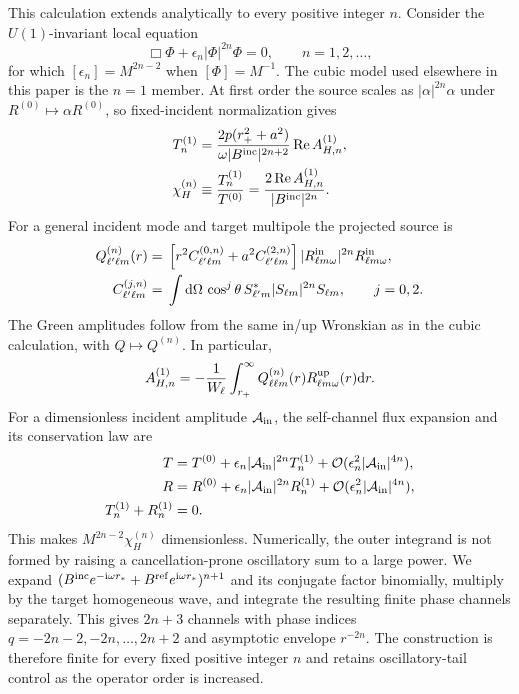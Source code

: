 \documentclass[aps,prd,twocolumn,10pt,nofootinbib,superscriptaddress,floatfix]{revtex4-2}
\newcommand{\dd}{\mathrm{d}}
\newcommand{\ii}{\mathrm{i}}
\newcommand{\calO}{\mathcal{O}}
\begin{document}
This calculation extends analytically to every positive integer $n$.  Consider
the $U(1)$-invariant local equation
\begin{equation}
 \Box\Phi+\epsilon_n|\Phi|^{2n}\Phi=0,
 \qquad n=1,2,\ldots,
 \label{eq:power-nonlinearity}
\end{equation}
for which $[\epsilon_n]=M^{2n-2}$ when $[\Phi]=M^{-1}$.  The cubic model used
elsewhere in this paper is the $n=1$ member.  At first order the source scales
as $|\alpha|^{2n}\alpha$ under
$R^{(0)}\mapsto\alpha R^{(0)}$, so fixed-incident normalization gives
\begin{align}
 T_n^{(1)}&=\frac{2p(r_+^2+a^2)}{\omega|B^{\rm inc}|^{2n+2}}
 \operatorname{Re}A_{H,n}^{(1)},\nonumber\\
 \chi_H^{(n)}&\equiv\frac{T_n^{(1)}}{T^{(0)}}
 =\frac{2\operatorname{Re}A_{H,n}^{(1)}}{|B^{\rm inc}|^{2n}}.
 \label{eq:power-response}
\end{align}
For a general incident mode and target multipole the projected source is
\begin{align}
 Q^{(n)}_{\ell'\ell m}(r)={}&
 \left[r^2C^{(0,n)}_{\ell'\ell m}
 +a^2C^{(2,n)}_{\ell'\ell m}\right]
 |R^{\rm in}_{\ell m\omega}|^{2n}R^{\rm in}_{\ell m\omega},
 \label{eq:power-radial-source}\\
 C^{(j,n)}_{\ell'\ell m}={}&\int\dd\Omega\,\cos^j\theta\,
 S_{\ell'm}^*|S_{\ell m}|^{2n}S_{\ell m},
 \qquad j=0,2 .
 \label{eq:power-angular-general}
\end{align}
The Green amplitudes follow from the same in/up Wronskian as in the cubic
calculation, with $Q\mapsto Q^{(n)}$.  In particular,
\begin{equation}
 A_{H,n}^{(1)}=-\frac{1}{W_\ell}\int_{r_+}^{\infty}
 Q^{(n)}_{\ell\ell m}(r)R^{\rm up}_{\ell m\omega}(r)\dd r .
 \label{eq:power-horizon-green}
\end{equation}
For a dimensionless incident amplitude ${\cal A}_{\rm in}$, the self-channel
flux expansion and its conservation law are
\begin{align}
 T={}&T^{(0)}+\epsilon_n|{\cal A}_{\rm in}|^{2n}T_n^{(1)}
 +\calO(\epsilon_n^2|{\cal A}_{\rm in}|^{4n}),\nonumber\\
 R={}&R^{(0)}+\epsilon_n|{\cal A}_{\rm in}|^{2n}R_n^{(1)}
 +\calO(\epsilon_n^2|{\cal A}_{\rm in}|^{4n}),\nonumber\\
 T_n^{(1)}+R_n^{(1)}={}&0 .
 \label{eq:power-flux-expansion}
\end{align}
This makes $M^{2n-2}\chi_H^{(n)}$ dimensionless.  Numerically, the outer
integrand is not formed by raising a cancellation-prone oscillatory sum to a
large power.  We expand
$(B^{\rm inc}e^{-\ii\omega r_*}+B^{\rm ref}e^{\ii\omega r_*})^{n+1}$ and
its conjugate factor binomially, multiply by the target homogeneous wave, and
integrate the resulting finite phase channels separately.  This gives
$2n+3$ channels with phase indices
$q=-2n-2,-2n,\ldots,2n+2$ and asymptotic envelope $r^{-2n}$.
The construction is therefore finite for every fixed positive integer $n$
and retains oscillatory-tail control as the operator order is increased.
\end{document}
